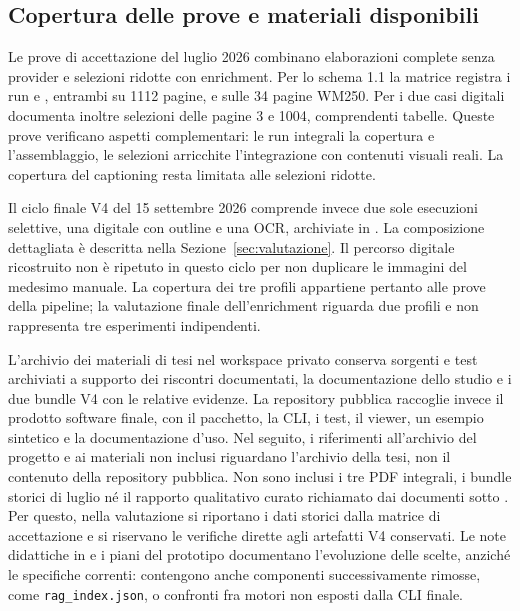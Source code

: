 \subsection{Copertura delle prove e materiali disponibili}

Le prove di accettazione del luglio 2026 combinano elaborazioni complete senza provider e selezioni ridotte con enrichment. Per lo schema 1.1 la matrice registra i run  e , entrambi su 1112 pagine, e  sulle 34 pagine WM250. Per i due casi digitali documenta inoltre selezioni delle pagine 3 e 1004, comprendenti tabelle. Queste prove verificano aspetti complementari: le run integrali la copertura e l'assemblaggio, le selezioni arricchite l'integrazione con contenuti visuali reali. La copertura del captioning resta limitata alle selezioni ridotte.

Il ciclo finale V4 del 15 settembre 2026 comprende invece due sole esecuzioni selettive, una digitale con outline e una OCR, archiviate in . La composizione dettagliata è descritta nella Sezione~\ref{sec:valutazione}. Il percorso digitale ricostruito non è ripetuto in questo ciclo per non duplicare le immagini del medesimo manuale. La copertura dei tre profili appartiene pertanto alle prove della pipeline; la valutazione finale dell'enrichment riguarda due profili e non rappresenta tre esperimenti indipendenti.

L'archivio dei materiali di tesi nel workspace privato  conserva sorgenti e test archiviati a supporto dei riscontri documentati, la documentazione dello studio e i due bundle V4 con le relative evidenze. La repository pubblica  raccoglie invece il prodotto software finale, con il pacchetto, la CLI, i test, il viewer, un esempio sintetico e la documentazione d'uso. Nel seguito, i riferimenti all'archivio del progetto e ai materiali non inclusi riguardano l'archivio della tesi, non il contenuto della repository pubblica. Non sono inclusi i tre PDF integrali, i bundle storici di luglio né il rapporto qualitativo curato richiamato dai documenti sotto . Per questo, nella valutazione si riportano i dati storici dalla matrice di accettazione e si riservano le verifiche dirette agli artefatti V4 conservati. Le note didattiche in  e i piani del prototipo documentano l'evoluzione delle scelte, anziché le specifiche correnti: contengono anche componenti successivamente rimosse, come \texttt{rag\_index.json}, o confronti fra motori non esposti dalla CLI finale.

